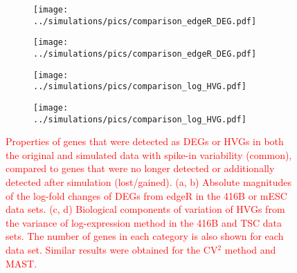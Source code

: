 \documentclass{article}
\newcommand\revised[1]{\textcolor{red}{#1}}
\begin{document}
\begin{figure}[btp]
    \begin{center}
        \begin{subfigure}{0.24\textwidth}
            \texttt{[image: ../simulations/pics/comparison\_edgeR\_DEG.pdf]}
            \caption{}
        \end{subfigure}
        \begin{subfigure}{0.24\textwidth}
            \texttt{[image: ../simulations/pics/comparison\_edgeR\_DEG.pdf]}
            \caption{}
        \end{subfigure}
        \begin{subfigure}{0.24\textwidth}
            \texttt{[image: ../simulations/pics/comparison\_log\_HVG.pdf]}
            \caption{}
        \end{subfigure}
        \begin{subfigure}{0.24\textwidth}
            \texttt{[image: ../simulations/pics/comparison\_log\_HVG.pdf]}
            \caption{}
        \end{subfigure}
    \end{center}
    \caption{\revised{Properties of genes that were detected as DEGs or HVGs in both the original and simulated data with spike-in variability (common), compared to genes that were no longer detected or additionally detected after simulation (lost/gained).
    (a, b) Absolute magnitudes of the log-fold changes of DEGs from edgeR in the 416B or mESC data sets.
    (c, d) Biological components of variation of HVGs from the variance of log-expression method in the 416B and TSC data sets.
    The number of genes in each category is also shown for each data set.
    Similar results were obtained for the CV$^2$ method and MAST.
}
    }
\end{figure}
\end{document}
